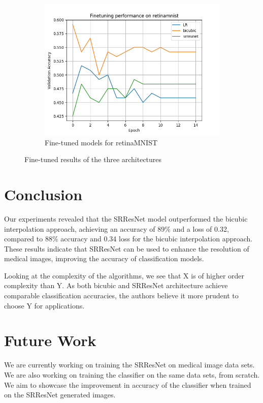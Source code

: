 \documentclass[10pt,twocolumn,letterpaper]{article}
\begin{document}
\begin{figure}
    \begin{subfigure}{0.3\textwidth}
        \includegraphics[width=\linewidth]{Code/plots/finetune_retinamnist.png}         \caption{Fine-tuned models for retinaMNIST}
        \label{fig:fine tune retina}
    \end{subfigure}
    \caption{Fine-tuned results of the three architectures}
    \label{fig: fine tune}
\end{figure}

\section{Conclusion}
Our experiments revealed that the SRResNet model outperformed the bicubic interpolation approach, achieving an accuracy of 89\% and a loss of 0.32, compared to 88\% accuracy and 0.34 loss for the bicubic interpolation approach. These results indicate that SRResNet can be used to enhance the resolution of medical images, improving the accuracy of classification models.

Looking at the complexity of the algorithms, we see that X is of higher order complexity than Y. As both bicubic and SRResNet architecture achieve comparable classification accuracies, the authors believe it more prudent to choose Y for applications.

\section{Future Work}
We are currently working on training the SRResNet on medical image data sets. We are also working on training the classifier on the same data sets, from scratch. We aim to showcase the improvement in accuracy of the classifier when trained on the SRResNet generated images.
\end{document}
